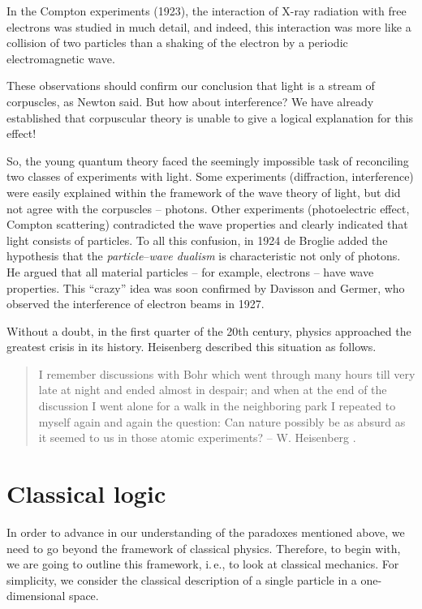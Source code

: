 \documentclass[nochecklpage]{stefan1}
\theoremstyle{definition}
\begin{document}
In the Compton experiments (1923), the
interaction of X-ray radiation with free electrons was studied in much
detail, and indeed, this interaction was more like a collision of two
particles than a shaking of the electron by a periodic electromagnetic
wave.

These observations should confirm our conclusion that light is a stream
of corpuscles, as Newton said. But how about interference? We have
already established that corpuscular theory is unable to give a logical
explanation for this effect!

So, the young quantum theory faced the seemingly impossible task of
reconciling two classes of experiments with light. Some experiments
(diffraction, interference) were easily explained within the framework
of the wave theory of light, but did not agree with the corpuscles --
photons. Other experiments (photoelectric effect, Compton scattering)
contradicted the wave properties and clearly indicated that light
consists of particles. To all this confusion, in 1924 de Broglie added
the hypothesis that the \emph{particle}--\emph{wave dualism}
 is characteristic not only of photons.
He argued that all material particles -- for example, electrons -- have
wave properties. This ``crazy'' idea was soon confirmed by Davisson and
Germer, who observed the interference of electron beams in 1927.

Without a doubt, in the first quarter of the 20th century, physics
approached the greatest crisis in its history. Heisenberg described this
situation as follows.
%
\begin{quote}
I remember discussions with Bohr which went through many hours till very
late at night and ended almost in despair; and when at the end of the
discussion I went alone for a walk in the neighboring park I repeated
to myself again and again the question: Can nature possibly be as absurd
as it seemed to us in those atomic experiments? -- W. Heisenberg
\cite{Heisenberg}.
\end{quote}

\section{Classical logic}\label{sc:1.1}
In order to advance in our understanding of the paradoxes mentioned
above, we need to go beyond the framework of classical physics.
Therefore, to begin with, we are going to outline this framework, i.\,e.,
to look at classical mechanics. For simplicity, we consider the
classical description of a single particle in a one-dimensional space.
\end{document}

